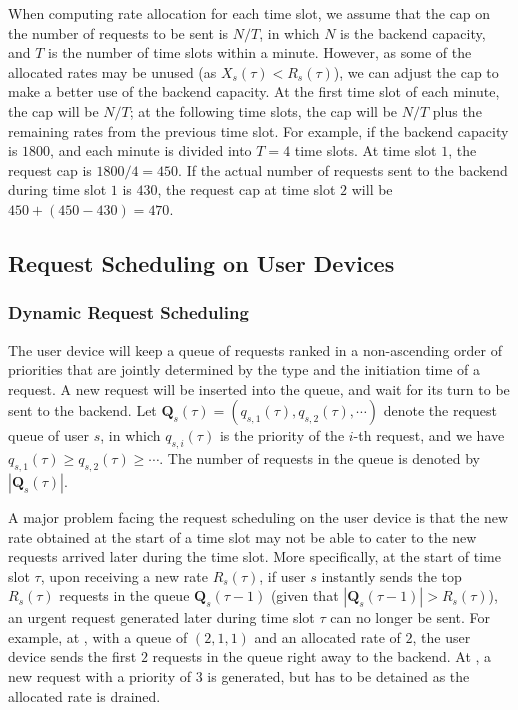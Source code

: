 When computing rate allocation for each time slot, we assume that the cap on the number of requests to be sent is $N/T$, in which $N$ is the backend capacity, and $T$ is the number of time slots within a minute. However, as some of the allocated rates may be unused (as $X_s(\tau) < R_s(\tau)$), we can adjust the cap to make a better use of the backend capacity. At the first time slot of each minute, the cap will be $N/T$; at the following time slots, the cap will be $N/T$ plus the remaining rates from the previous time slot. For example, if the backend capacity is $1800$, and each minute is divided into $T=4$ time slots. At time slot $1$, the request cap is $1800/4 = 450$. If the actual number of requests sent to the backend during time slot $1$ is $430$, the request cap at time slot $2$ will be $450+(450-430) = 470$.

 

\subsection{Request Scheduling on User Devices}\label{sec:sending}

\subsubsection{Dynamic Request Scheduling}
The user device will keep a queue of requests ranked in a non-ascending order of priorities that are jointly determined by the type and the initiation time of a request. A new request will be inserted into the queue, and wait for its turn to be sent to the backend. Let $\pmb{Q}_s(\tau) = (q_{s,1}(\tau), q_{s,2}(\tau),\cdots)$ denote the request queue of user $s$, in which $q_{s,i}(\tau)$ is the priority of the $i$-th request, and we have $q_{s,1}(\tau) \ge q_{s,2}(\tau)\ge \cdots$. The number of requests in the queue is denoted by $|\pmb{Q}_s(\tau)|$.

A major problem facing the request scheduling on the user device is that the new rate obtained at the start of a time slot may not be able to cater to the new requests arrived later during the time slot. More specifically, at the start of time slot $\tau$, upon receiving a new rate $R_s(\tau)$, if user $s$ instantly sends the top $R_s(\tau)$ requests in the queue $\pmb{Q}_s(\tau-1)$ (given that $|\pmb{Q}_s(\tau-1)| > R_s(\tau)$), an urgent request generated later during time slot $\tau$ can no longer be sent. For example, at , with a queue of $(2,1,1)$ and an allocated rate of $2$, the user device sends the first $2$ requests in the queue right away to the backend. At , a new request with a priority of $3$ is generated, but has to be detained as the allocated rate is drained. 

